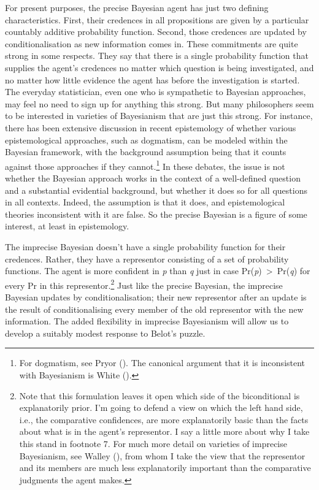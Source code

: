 \documentclass[
  10pt,
  letterpaper,
  DIV=11,
  numbers=noendperiod,
  twoside]{scrartcl}
\begin{document}
For present purposes, the precise Bayesian agent has just two defining
characteristics. First, their credences in all propositions are given by
a particular countably additive probability function. Second, those
credences are updated by conditionalisation as new information comes in.
These commitments are quite strong in some respects. They say that there
is a single probability function that supplies the agent's credences no
matter which question is being investigated, and no matter how little
evidence the agent has before the investigation is started. The everyday
statistician, even one who is sympathetic to Bayesian approaches, may
feel no need to sign up for anything this strong. But many philosophers
seem to be interested in varieties of Bayesianism that are just this
strong. For instance, there has been extensive discussion in recent
epistemology of whether various epistemological approaches, such as
dogmatism, can be modeled within the Bayesian framework, with the
background assumption being that it counts against those approaches if
they cannot.\footnote{For dogmatism, see Pryor
  (). The canonical argument that it is
  inconsistent with Bayesianism is White
  ().} In these debates, the issue is not
whether the Bayesian approach works in the context of a well-defined
question and a substantial evidential background, but whether it does so
for all questions in all contexts. Indeed, the assumption is that it
does, and epistemological theories inconsistent with it are false. So
the precise Bayesian is a figure of some interest, at least in
epistemology.

The imprecise Bayesian doesn't have a single probability function for
their credences. Rather, they have a representor consisting of a set of
probability functions. The agent is more confident in \emph{p} than
\emph{q} just in case Pr(\emph{p})~\textgreater~Pr(\emph{q}) for every
Pr in this representor.\footnote{Note that this formulation leaves it
  open which side of the biconditional is explanatorily prior. I'm going
  to defend a view on which the left hand side, i.e., the comparative
  confidences, are more explanatorily basic than the facts about what is
  in the agent's representor. I say a little more about why I take this
  stand in footnote 7. For much more detail on varieties of imprecise
  Bayesianism, see Walley (), from whom I
  take the view that the representor and its members are much less
  explanatorily important than the comparative judgments the agent
  makes.} Just like the precise Bayesian, the imprecise Bayesian updates
by conditionalisation; their new representor after an update is the
result of conditionalising every member of the old representor with the
new information. The added flexibility in imprecise Bayesianism will
allow us to develop a suitably modest response to Belot's puzzle.
\end{document}
